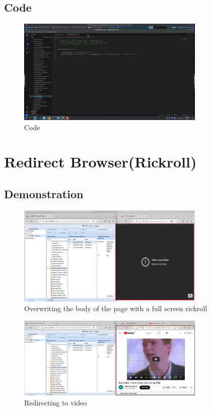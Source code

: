 \documentclass{report}
\begin{document}
\pagebreak

\subsection{Code}
\begin{figure}[!htbp]
    \centering
    \includegraphics[width=0.8\textwidth]{Redirect Browser/code.png}
    \caption{Code}
    \label{fig:rb3}
\end{figure}

\pagebreak

\section{Redirect Browser(Rickroll)}
\subsection{Demonstration}
\begin{figure}[!htbp]
    \centering
    \includegraphics[width=0.8\textwidth]{Redirect Browser(Rickroll)/1.png}
    \caption{Overwriting the body of the page with a full screen rickroll}
    \label{fig:rr1}
\end{figure}

\begin{figure}[!htbp]
    \centering
    \includegraphics[width=0.8\textwidth]{Redirect Browser(Rickroll)/2.png}
    \caption{Redirecting to video}
    \label{fig:rr2}
\end{figure}
\end{document}
